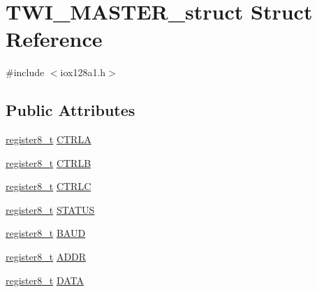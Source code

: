 \hypertarget{struct_t_w_i___m_a_s_t_e_r__struct}{
\section{TWI\_\-MASTER\_\-struct Struct Reference}
\label{struct_t_w_i___m_a_s_t_e_r__struct}
}


{\ttfamily \#include $<$iox128a1.h$>$}

\subsection*{Public Attributes}
\begin{DoxyCompactItemize}
\item 
\hyperlink{iox128a1_8h_a6a0649252b392263406882923b04a9db}{register8\_\-t} \hyperlink{struct_t_w_i___m_a_s_t_e_r__struct_ac4c9558296f78de70aea7220a369f8d0}{CTRLA}
\item 
\hyperlink{iox128a1_8h_a6a0649252b392263406882923b04a9db}{register8\_\-t} \hyperlink{struct_t_w_i___m_a_s_t_e_r__struct_a6bec6f15f02825dbd6eeb1b47b9f5c59}{CTRLB}
\item 
\hyperlink{iox128a1_8h_a6a0649252b392263406882923b04a9db}{register8\_\-t} \hyperlink{struct_t_w_i___m_a_s_t_e_r__struct_a8294d4047384a14284395f25c4c8e1fa}{CTRLC}
\item 
\hyperlink{iox128a1_8h_a6a0649252b392263406882923b04a9db}{register8\_\-t} \hyperlink{struct_t_w_i___m_a_s_t_e_r__struct_aea15764b94901a2cd5664d75abdf1388}{STATUS}
\item 
\hyperlink{iox128a1_8h_a6a0649252b392263406882923b04a9db}{register8\_\-t} \hyperlink{struct_t_w_i___m_a_s_t_e_r__struct_acaaf4bbb5de65800b100ec77d9b743c8}{BAUD}
\item 
\hyperlink{iox128a1_8h_a6a0649252b392263406882923b04a9db}{register8\_\-t} \hyperlink{struct_t_w_i___m_a_s_t_e_r__struct_a449768ab77f1af722867a7a936227c91}{ADDR}
\item 
\hyperlink{iox128a1_8h_a6a0649252b392263406882923b04a9db}{register8\_\-t} \hyperlink{struct_t_w_i___m_a_s_t_e_r__struct_ad8a09a564ae6ff6ad6038dd1b6b29131}{DATA}
\end{DoxyCompactItemize}


